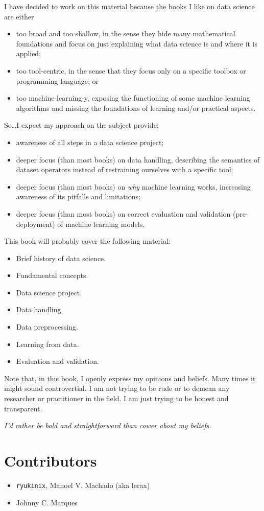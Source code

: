 I have decided to work on this material because the books I like on data science are
either
\begin{itemize}
  \item too broad and too shallow, in the sense they hide many mathematical foundations
    and focus on just explaining what data science is and where it is applied;
  \item too tool-centric, in the sense that they focus only on a specific toolbox or
    programming language; or
  \item too machine-learning-y, exposing the functioning of some machine learning
    algorithms and missing the foundations of learning and/or practical aspects.
\end{itemize}

So\dots I expect my approach on the subject provide:
\begin{itemize}
  \item awareness of all steps in a data science project;
  \item deeper focus (than most books) on data handling, describing the semantics of dataset
    operators instead of restraining ourselves with a specific tool;
  \item deeper focus (than most books) on \emph{why} machine learning works, increasing awareness of its pitfalls and
    limitations;
  \item deeper focus (than most books) on correct evaluation and validation
    (pre-deployment) of machine learning models.
\end{itemize}

This book will probably cover the following material:
\begin{itemize}
  \item Brief history of data science.
  \item Fundamental concepts.
  \item Data science project.
  \item Data handling.
  \item Data preprocessing.
  \item Learning from data.
  \item Evaluation and validation.
\end{itemize}

Note that, in this book, I openly express my opinions and beliefs. Many times it might sound
controvertial.  I am not trying to be rude or to demean any researcher or practitioner in the
field.  I am just trying to be honest and transparent.

\emph{I'd rather be bold and straightforward than cower about my beliefs.}

\section{Contributors}

\begin{itemize}
    \itemsep0em
    \item \texttt{ryukinix}, Manoel V. Machado (aka lerax)
    \item Johnny C. Marques
\end{itemize}

